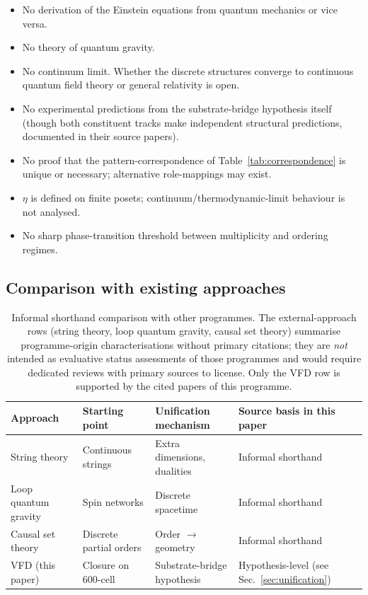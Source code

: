 \documentclass[12pt]{article}
\begin{document}
\begin{itemize}
    \item No derivation of the Einstein equations from quantum mechanics or vice versa.
    \item No theory of quantum gravity.
    \item No continuum limit. Whether the discrete structures converge to continuous quantum field theory or general relativity is open.
    \item No experimental predictions from the substrate-bridge hypothesis itself (though both constituent tracks make independent structural predictions, documented in their source papers).
    \item No proof that the pattern-correspondence of Table~\ref{tab:correspondence} is unique or necessary; alternative role-mappings may exist.
    \item $\eta$ is defined on finite posets; continuum/thermodynamic-limit behaviour is not analysed.
    \item No sharp phase-transition threshold between multiplicity and ordering regimes.
\end{itemize}

\subsection{Comparison with existing approaches}

\begin{table}[ht]
\centering
\caption{Informal shorthand comparison with other programmes. The external-approach rows (string theory, loop quantum gravity, causal set theory) summarise programme-origin characterisations without primary citations; they are \emph{not} intended as evaluative status assessments of those programmes and would require dedicated reviews with primary sources to license. Only the VFD row is supported by the cited papers of this programme.}
\label{tab:comparison}
\begin{tabular}{@{}llll@{}}
\toprule
Approach & Starting point & Unification mechanism & Source basis in this paper \\
\midrule
String theory & Continuous strings & Extra dimensions, dualities & Informal shorthand \\
Loop quantum gravity & Spin networks & Discrete spacetime & Informal shorthand \\
Causal set theory & Discrete partial orders & Order $\to$ geometry & Informal shorthand \\
VFD (this paper) & Closure on 600-cell & Substrate-bridge hypothesis & Hypothesis-level (see Sec.~\ref{sec:unification}) \\
\bottomrule
\end{tabular}
\end{table}
\end{document}

